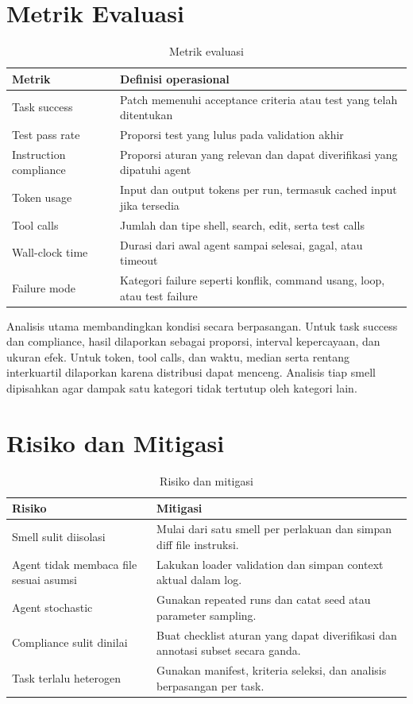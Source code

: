 \section{Metrik Evaluasi}

\begin{table}[htbp]
\centering
\small
\caption{Metrik evaluasi}
\label{tab:metrics}
\begin{tabularx}{\textwidth}{p{3.4cm}Y}
\toprule
\textbf{Metrik} & \textbf{Definisi operasional} \\
\midrule
Task success & Patch memenuhi acceptance criteria atau test yang telah ditentukan \\
Test pass rate & Proporsi test yang lulus pada validation akhir \\
Instruction compliance & Proporsi aturan yang relevan dan dapat diverifikasi yang dipatuhi agent \\
Token usage & Input dan output tokens per run, termasuk cached input jika tersedia \\
Tool calls & Jumlah dan tipe shell, search, edit, serta test calls \\
Wall-clock time & Durasi dari awal agent sampai selesai, gagal, atau timeout \\
Failure mode & Kategori failure seperti konflik, command usang, loop, atau test failure \\
\bottomrule
\end{tabularx}
\end{table}

Analisis utama membandingkan kondisi secara berpasangan. Untuk task success dan compliance, hasil dilaporkan sebagai proporsi, interval kepercayaan, dan ukuran efek. Untuk token, tool calls, dan waktu, median serta rentang interkuartil dilaporkan karena distribusi dapat menceng. Analisis tiap smell dipisahkan agar dampak satu kategori tidak tertutup oleh kategori lain.

\section{Risiko dan Mitigasi}

\begin{table}[htbp]
\centering
\small
\caption{Risiko dan mitigasi}
\label{tab:risks}
\begin{tabularx}{\textwidth}{p{4.0cm}Y}
\toprule
\textbf{Risiko} & \textbf{Mitigasi} \\
\midrule
Smell sulit diisolasi & Mulai dari satu smell per perlakuan dan simpan diff file instruksi. \\
Agent tidak membaca file sesuai asumsi & Lakukan loader validation dan simpan context aktual dalam log. \\
Agent stochastic & Gunakan repeated runs dan catat seed atau parameter sampling. \\
Compliance sulit dinilai & Buat checklist aturan yang dapat diverifikasi dan annotasi subset secara ganda. \\
Task terlalu heterogen & Gunakan manifest, kriteria seleksi, dan analisis berpasangan per task. \\
\bottomrule
\end{tabularx}
\end{table}

